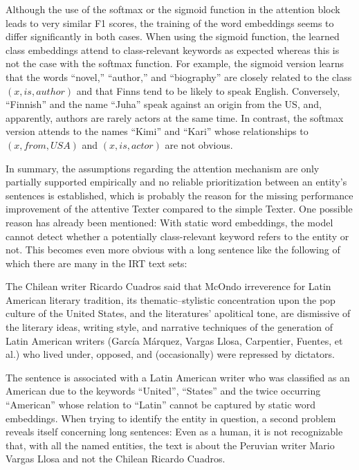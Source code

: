 Although the use of the softmax or the sigmoid function in the attention block leads to very similar F1 scores, the training of the word embeddings seems to differ significantly in both cases. When using the sigmoid function, the learned class embeddings attend to class-relevant keywords as expected whereas this is not the case with the softmax function. For example, the sigmoid version learns that the words ``novel,'' ``author,'' and ``biography'' are closely related to the class $(x, is, author)$ and that Finns tend to be likely to speak English. Conversely, ``Finnish'' and the name ``Juha'' speak against an origin from the US, and, apparently, authors are rarely actors at the same time. In contrast, the softmax version attends to the names ``Kimi'' and ``Kari'' whose relationships  to $(x, from, USA)$ and $(x, is, actor)$ are not obvious.

In summary, the assumptions regarding the attention mechanism are only partially supported empirically and no reliable prioritization between an entity's sentences is established, which is probably the reason for the missing performance improvement of the attentive Texter compared to the simple Texter. One possible reason has already been mentioned: With static word embeddings, the model cannot detect whether a potentially class-relevant keyword refers to the entity or not. This becomes even more obvious with a long sentence like the following of which there are many in the IRT text sets:

\begin{displayquote}
    The Chilean writer Ricardo Cuadros said that McOndo irreverence for Latin American literary tradition, its thematic–stylistic concentration upon the pop culture of the United States, and the literatures’ apolitical tone, are dismissive of the literary ideas, writing style, and narrative techniques of the generation of Latin American writers (García Márquez, Vargas Llosa, Carpentier, Fuentes, et al.) who lived under, opposed, and (occasionally) were repressed by dictators.
\end{displayquote}

The sentence is associated with a Latin American writer who was classified as an American due to the keywords ``United'', ``States'' and the twice occurring ``American'' whose relation to ``Latin'' cannot be captured by static word embeddings. When trying to identify the entity in question, a second problem reveals itself concerning long sentences: Even as a human, it is not recognizable that, with all the named entities, the text is about the Peruvian writer Mario Vargas Llosa and not the Chilean Ricardo Cuadros.
